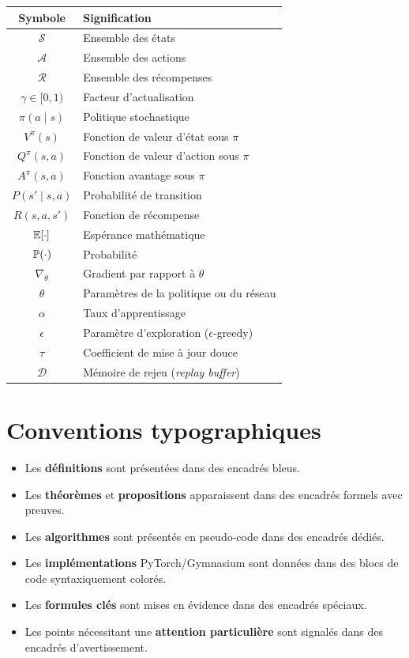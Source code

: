 \begin{center}
\renewcommand{\arraystretch}{1.3}
\begin{tabular}{cl}
    \toprule
    \textbf{Symbole} & \textbf{Signification} \\
    \midrule
    $\mathcal{S}$ & Ensemble des \'etats \\
    $\mathcal{A}$ & Ensemble des actions \\
    $\mathcal{R}$ & Ensemble des r\'ecompenses \\
    $\gamma \in [0,1)$ & Facteur d'actualisation \\
    $\pi(a \mid s)$ & Politique stochastique \\
    $V^\pi(s)$ & Fonction de valeur d'\'etat sous $\pi$ \\
    $Q^\pi(s,a)$ & Fonction de valeur d'action sous $\pi$ \\
    $A^\pi(s,a)$ & Fonction avantage sous $\pi$ \\
    $P(s' \mid s, a)$ & Probabilit\'e de transition \\
    $R(s, a, s')$ & Fonction de r\'ecompense \\
    $\mathbb{E}[\cdot]$ & Esp\'erance math\'ematique \\
    $\mathbb{P}(\cdot)$ & Probabilit\'e \\
    $\nabla_\theta$ & Gradient par rapport \`a $\theta$ \\
    $\theta$ & Param\`etres de la politique ou du r\'eseau \\
    $\alpha$ & Taux d'apprentissage \\
    $\epsilon$ & Param\`etre d'exploration ($\epsilon$-greedy) \\
    $\tau$ & Coefficient de mise \`a jour douce \\
    $\mathcal{D}$ & M\'emoire de rejeu (\emph{replay buffer}) \\
    \bottomrule
\end{tabular}
\end{center}

\section*{Conventions typographiques}

\begin{itemize}
    \item Les \textbf{d\'efinitions} sont pr\'esent\'ees dans des encadr\'es bleus.
    \item Les \textbf{th\'eor\`emes} et \textbf{propositions} apparaissent dans des
    encadr\'es formels avec preuves.
    \item Les \textbf{algorithmes} sont pr\'esent\'es en pseudo-code dans des encadr\'es
    d\'edi\'es.
    \item Les \textbf{impl\'ementations} PyTorch/Gymnasium sont donn\'ees dans des blocs
    de code syntaxiquement color\'es.
    \item Les \textbf{formules cl\'es} sont mises en \'evidence dans des encadr\'es
    sp\'eciaux.
    \item Les points n\'ecessitant une \textbf{attention particuli\`ere} sont signal\'es
    dans des encadr\'es d'avertissement.
\end{itemize}

